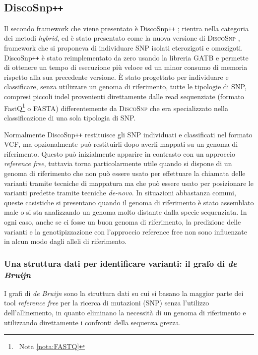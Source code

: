 \documentclass[../main.tex]{subfiles}
\begin{document}
\subsection{DiscoSnp\texttt{++}}
\label{discosnp++}

Il secondo framework che viene presentato è DiscoSnp\texttt{++} \cite{peterlongo2017discosnp++}; rientra nella categoria dei metodi \textit{hybrid}, ed è stato presentato come la nuova versione di \textsc{DiscoSnp} \cite{uricaru2015reference}, framework che si proponeva di individuare SNP isolati eterozigoti e omozigoti. DiscoSnp\texttt{++} è stato reimplementato da zero usando la libreria GATB \cite{drezen2014gatb} e permette di ottenere un tempo di esecuzione più veloce ed un minor consumo di memoria rispetto alla sua precedente versione. È stato progettato per individuare e classificare, senza utilizzare un genoma di riferimento, tutte le tipologie di SNP, compresi piccoli indel provenienti direttamente dalle read sequenziate (formato FastQ\footnote{\ Nota \vref{nota:FASTQ}} o FASTA) differentemente da \textsc{DiscoSnp} che era specializzato nella classificazione di una sola tipologia di SNP.

Normalmente DiscoSnp\texttt{++} restituisce gli SNP individuati e classificati nel formato VCF, ma opzionalmente può restituirli dopo averli mappati su un genoma di riferimento. Questo può inizialmente apparire in contrasto con un approccio \textit{reference free}, tuttavia torna particolarmente utile quando si dispone di un genoma di riferimento che non può essere usato per effettuare la chiamata delle varianti tramite tecniche di mappatura ma che può essere usato per posizionare le varianti predette tramite tecniche \textit{de-novo}. In situazioni abbastanza comuni, queste casistiche si presentano quando il genoma di riferimento è stato assemblato male o si sta analizzando un genoma molto distante dalla specie sequenziata. In ogni caso, anche se ci fosse un buon genoma di riferimento, la predizione delle varianti e la genotipizzazione con l'approccio reference free non sono influenzate in alcun modo dagli alleli di riferimento.

\subsubsection{Una struttura dati per identificare varianti: il grafo di \textit{de Bruijn}}
\label{dBG}

I grafi di \textit{de Bruijn} sono la struttura dati su cui si basano la maggior parte dei tool \textit{reference free} per la  ricerca di mutazioni (SNP) senza l'utilizzo dell'allinemento, in quanto eliminano la necessità di un genoma di riferimento e utilizzando direttamente i confronti della sequenza grezza.
\end{document}
